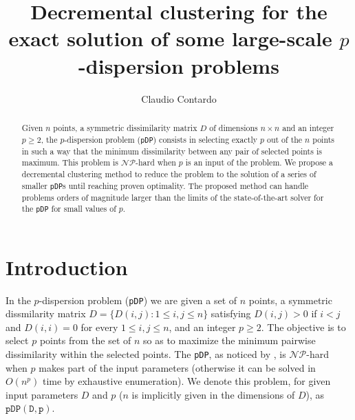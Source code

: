 \documentclass[a4paper,10pt]{article}
\newcommand{\nphard}{$\mathcal{NP}$-hard}
\newcommand{\pDP}{\texttt{pDP}}
\newcommand{\pdp}[2]{$\mathtt{pDP({#1}, {#2})}$}
\begin{document}
\title{Decremental clustering for the exact solution of some large-scale $p$-dispersion problems}

\author[ ]{Claudio Contardo}



\maketitle

\begin{abstract}
Given $n$ points, a symmetric dissimilarity matrix $D$ of dimensions $n\times n$ and an integer $p\geq 2$, the $p$-dispersion problem (\pDP{}) consists in selecting exactly $p$ out of the $n$ points in such a way that the minimum dissimilarity between any pair of selected points is maximum. This problem is \nphard{} when $p$ is an input of the problem. We propose a decremental clustering method to reduce the problem to the solution of a series of smaller \pDP{}s until reaching proven optimality. The proposed method can handle problems orders of magnitude larger than the limits of the state-of-the-art solver for the \pDP{} for small values of $p$.
\end{abstract}

\section{Introduction\label{section:intro}}

In the $p$-dispersion problem (\pDP{}) we are given a set of $n$ points, a symmetric dissmilarity matrix $D = \{D(i, j): 1\leq i, j\leq n\}$ satisfying $D(i, j) > 0$ if $i < j$ and $D(i, i) = 0$ for every $1\leq i, j\leq n$, and an integer $p\geq 2$. The objective is to select $p$ points from the set of $n$ so as to maximize the minimum pairwise dissimilarity within the selected points. The \pDP{}, as noticed by \citet{Erkut1990discrete}, is \nphard{} when $p$ makes part of the input parameters (otherwise it can be solved in $O(n^p)$ time by exhaustive enumeration). We denote this problem, for given input parameters $D$ and $p$ ($n$ is implicitly given in the dimensions of $D$), as \pdp{D}{p}.%
\end{document}
